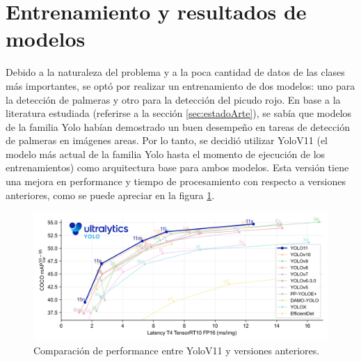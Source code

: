 \section{Entrenamiento y resultados de modelos}
\label{sec:entrenamientoModelos}


Debido a la naturaleza del problema y a la poca cantidad de datos de las clases más importantes, se optó por realizar un entrenamiento de dos modelos: uno para la detección de palmeras y otro para la detección del picudo rojo. En base a la literatura estudiada (referirse a la sección \ref{sec:estadoArte}), se sabía que modelos de la familia Yolo habían demostrado un buen desempeño en tareas de detección de palmeras en imágenes areas. Por lo tanto, se decidió utilizar YoloV11 (el modelo más actual de la familia Yolo hasta el momento de ejecución de los entrenamientos) como arquitectura base para ambos modelos. Esta versión tiene una mejora en performance y tiempo de procesamiento con respecto a versiones anteriores, como se puede apreciar en la figura \ref{fig:yolov11-comparison}.

\begin{figure}[H]
    \centering
    \includegraphics[scale=0.1]{./Figures/performance-comparison-yolov11.png}
    \caption{Comparación de performance entre YoloV11 y versiones anteriores. \protect\footnotemark}
    \label{fig:yolov11-comparison}
\end{figure}


